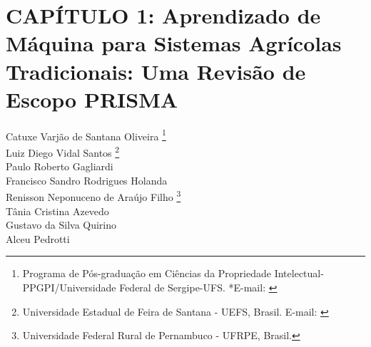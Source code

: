 \pagestyle{plain}

\chapter{CAPÍTULO 1: Aprendizado de Máquina para Sistemas Agrícolas Tradicionais: Uma Revisão de Escopo PRISMA}


\begin{flushright}
Catuxe Varjão de Santana Oliveira  \footnote[1]{Programa de Pós-graduação em Ciências da Propriedade Intelectual-PPGPI/Universidade Federal de Sergipe-UFS. *E-mail:  \href{mailto:catuxe@academico.ufs.br}{}}
\\[0.3cm]
Luiz Diego Vidal Santos \footnote[2]{Universidade Estadual de Feira de Santana - UEFS, Brasil. E-mail: \href{mailto:ldvsantos@uefs.br}{}}
\\[0.3cm]
Paulo Roberto Gagliardi \footnotemark[1]
\\[0.3cm]
Francisco Sandro Rodrigues Holanda \footnotemark[1]
\\[0.3cm]
Renisson Neponuceno de Araújo Filho \footnote[3]{Universidade Federal Rural de Pernambuco - UFRPE, Brasil.}
\\[0.3cm]
Tânia Cristina Azevedo \footnotemark[2]
\\[0.3cm]
Gustavo da Silva Quirino \footnotemark[1]
\\[0.3cm]
Alceu Pedrotti \footnotemark[1]
\end{flushright}


